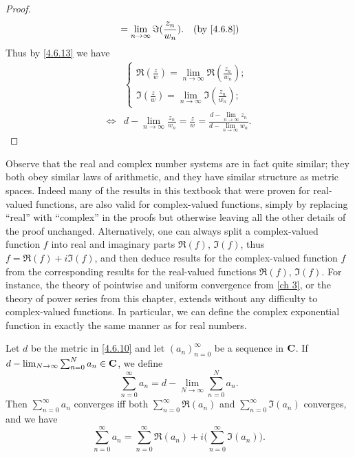 \begin{proof}
\begin{align*}
                     & = \lim_{n \to \infty} \Im(\frac{z_n}{w_n}).                                                                       & \text{(by \cref{4.6.8})}
  \end{align*}
  Thus by \cref{4.6.13} we have
  \begin{align*}
         & \begin{cases}
             \Re(\frac{z}{w}) = \lim_{n \to \infty} \Re(\frac{z_n}{w_n}); \\
             \Im(\frac{z}{w}) = \lim_{n \to \infty} \Im(\frac{z_n}{w_n});
           \end{cases}                                                             \\
    \iff & d - \lim_{n \to \infty} \frac{z_n}{w_n} = \frac{z}{w} = \frac{d - \lim_{n \to \infty} z_n}{d - \lim_{n \to \infty} w_n}.
  \end{align*}
\end{proof}

\begin{note}
  Observe that the real and complex number systems are in fact quite similar;
  they both obey similar laws of arithmetic, and they have similar structure as metric spaces.
  Indeed many of the results in this textbook that were proven for real-valued functions, are also valid for complex-valued functions, simply by replacing ``real'' with ``complex'' in the proofs but otherwise leaving all the other details of the proof unchanged.
  Alternatively, one can always split a complex-valued function \(f\) into real and imaginary parts \(\Re(f)\), \(\Im(f)\), thus \(f = \Re(f) + i \Im(f)\), and then deduce results for the complex-valued function \(f\) from the corresponding results for the real-valued functions \(\Re(f)\), \(\Im(f)\).
  For instance, the theory of pointwise and uniform convergence from \cref{ch 3}, or the theory of power series from this chapter, extends without any difficulty to complex-valued functions.
  In particular, we can define the complex exponential function in exactly the same manner as for real numbers.
\end{note}

\begin{additional corollary}\label{ac 4.6.6}
Let \(d\) be the metric in \cref{4.6.10} and let \((a_n)_{n = 0}^\infty\) be a sequence in \(\mathbf{C}\).
If \(d - \lim_{N \to \infty} \sum_{n = 0}^N a_n \in \mathbf{C}\), we define
\[
  \sum_{n = 0}^\infty a_n = d - \lim_{N \to \infty} \sum_{n = 0}^N a_n.
\]
Then \(\sum_{n = 0}^\infty a_n\) converges iff both \(\sum_{n = 0}^\infty \Re(a_n)\) and \(\sum_{n = 0}^\infty \Im(a_n)\) converges, and we have
\[
  \sum_{n = 0}^\infty a_n = \sum_{n = 0}^\infty \Re(a_n) + i \bigg(\sum_{n = 0}^\infty \Im(a_n)\bigg).
\]
\end{additional corollary}

